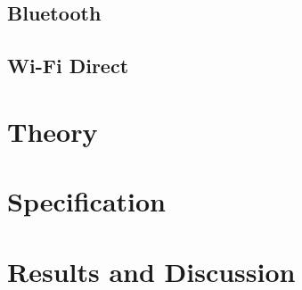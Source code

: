 \documentclass[twocolumn]{article}
\begin{document}


\subsection{Bluetooth} %


\subsection{Wi-Fi Direct} %


\section{Theory}\label{sec:theory} %




\section{Specification}\label{sec:specification} %








\section{Results and Discussion}\label{sec:results-discussion} %
\end{document}
